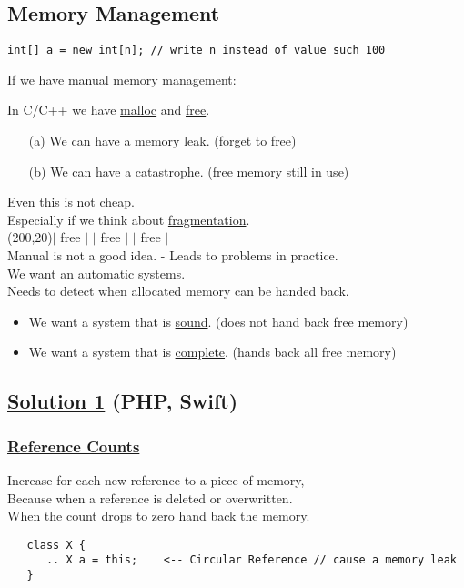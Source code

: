 \documentclass{article}
\begin{document}
\begin{flushleft}
\begin{flushleft}
\begin{flushleft}
\begin{flushleft}
\section*{Memory Management}
\begin{flushleft}
\verb|int[] a = new int[n]; // write n instead of value such 100 | 
\end{flushleft}
\bigskip
If we have \underline{manual} memory management:
\begin{flushleft}
In C/C++ we have \underline{malloc} and \underline{free}.\\
\bigskip
\begin{itemize}
\item[(a)] We can have a memory leak. (forget to free)
\item[(b)] We can have a catastrophe. (free memory still in use)
\end{itemize}
\bigskip
Even this is not cheap.\\
Especially if we think about \underline{fragmentation}.\\
\vspace*{1cm}
\framebox(200,20){\huge $|$ free $|$      $|$ free $|$      $|$ free $|$}\\
\vspace*{1cm}
Manual is not a good idea. - Leads to problems in practice.\\
\vspace*{0.1cm}
We want an automatic systems.\\
\vspace*{0.1cm}
Needs to detect when allocated memory can be handed back.
\bigskip
\begin{itemize}
  \item We want a system that is \underline{sound}. (does not hand back free memory)
  \item We want a system that is \underline{complete}. (hands back all free memory)
\end{itemize}
\end{flushleft}
\vspace*{1cm}
\subsection*{\underline{Solution 1} (PHP, Swift)}
\subsubsection*{\underline{Reference Counts}}
 \begin{flushleft}
Increase for each new reference to a piece of memory,\\
\vspace*{0.1cm}
Because when a reference is deleted or overwritten.\\
\vspace*{0.1cm}
When the count drops to \underline{zero} hand back the memory.
\bigskip
  \begin{verbatim}
   class X {
      .. X a = this;    <-- Circular Reference // cause a memory leak
   }
\end{verbatim}
\end{flushleft}

\end{flushleft}
\end{flushleft}
\end{flushleft}
\end{flushleft}
\end{document}

